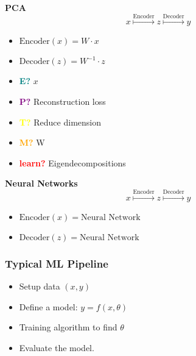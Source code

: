 \documentclass{article}
\begin{document}
\begin{example} \textbf{PCA}
    \begin{equation}
        x \overset{\text{Encoder}}{\mapsto} z \overset{\text{Decoder}}{\mapsto} y
    \end{equation}
    \begin{itemize}
        \item $\text{Encoder}(x) = W \cdot x$
        \item $\text{Decoder}(z) = W^{-1} \cdot z$
    \end{itemize}
    \vspace{1em}

    \begin{itemize}
        \item \textcolor{teal}{\textbf{E?}} $x$
        \item \textcolor{purple}{\textbf{P?}} Reconstruction loss
        \item \textcolor{yellow}{\textbf{T?}} Reduce dimension
        \item \textcolor{orange}{\textbf{M?}} W
        \item \textcolor{red}{\textbf{learn?}} Eigendecompositions
    \end{itemize}
\end{example}

\begin{example} \textbf{Neural Networks}
    \begin{equation}
        x \overset{\text{Encoder}}{\mapsto} z \overset{\text{Decoder}}{\mapsto} y
    \end{equation}
    \begin{itemize}
        \item $\text{Encoder}(x) = \text{Neural Network}$
        \item $\text{Decoder}(z) = \text{Neural Network}$
    \end{itemize}
\end{example}

\subsubsection{Typical ML Pipeline}
\begin{notes}
    \begin{itemize}
        \item Setup data $(x,y)$
        \item Define a model: $y = f(x,\theta)$
        \item Training algorithm to find $\theta$
        \item Evaluate the model.
    \end{itemize}
\end{notes}
\end{document}
